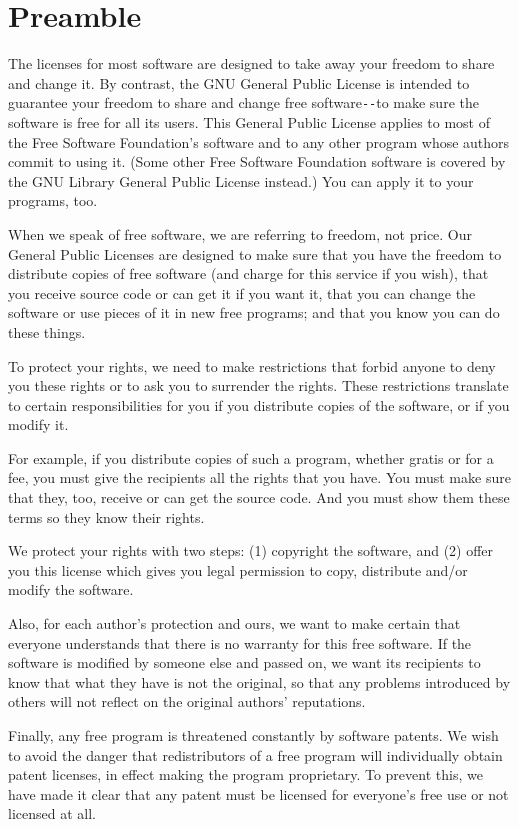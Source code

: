 \section{Preamble}
\label{SEC2}

The licenses for most software are designed to take away your freedom to share
and change it. By contrast, the GNU General Public License is intended to
guarantee your freedom to share and change free software\verb:--:to make sure the
software is free for all its users. This General Public License applies to
most of the Free Software Foundation's software and to any other program whose
authors commit to using it. (Some other Free Software Foundation software is
covered by the GNU Library General Public License instead.) You can apply it
to your programs, too. 

When we speak of free software, we are referring to freedom, not price. Our
General Public Licenses are designed to make sure that you have the freedom to
distribute copies of free software (and charge for this service if you wish),
that you receive source code or can get it if you want it, that you can change
the software or use pieces of it in new free programs; and that you know you
can do these things. 

To protect your rights, we need to make restrictions that forbid anyone to
deny you these rights or to ask you to surrender the rights. These
restrictions translate to certain responsibilities for you if you distribute
copies of the software, or if you modify it. 

For example, if you distribute copies of such a program, whether gratis or for
a fee, you must give the recipients all the rights that you have. You must
make sure that they, too, receive or can get the source code. And you must
show them these terms so they know their rights. 

We protect your rights with two steps: (1) copyright the software, and (2)
offer you this license which gives you legal permission to copy, distribute
and/or modify the software. 

Also, for each author's protection and ours, we want to make certain that
everyone understands that there is no warranty for this free software. If the
software is modified by someone else and passed on, we want its recipients to
know that what they have is not the original, so that any problems introduced
by others will not reflect on the original authors' reputations. 

Finally, any free program is threatened constantly by software patents. We
wish to avoid the danger that redistributors of a free program will
individually obtain patent licenses, in effect making the program proprietary.
To prevent this, we have made it clear that any patent must be licensed for
everyone's free use or not licensed at all. 

